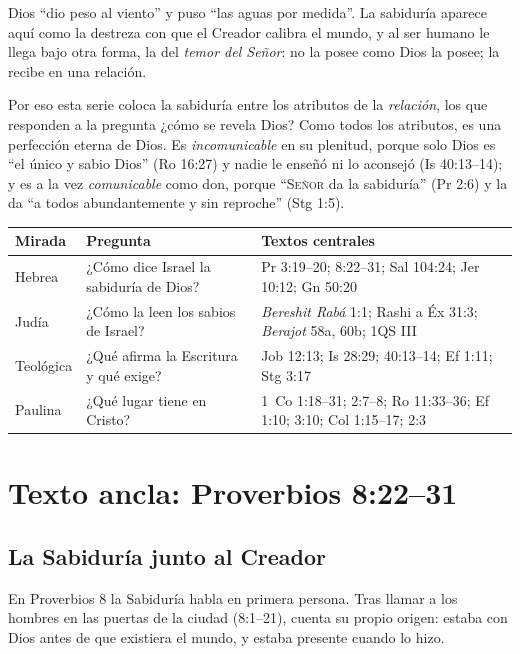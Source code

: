 \documentclass[11pt,letterpaper]{article}
\newcommand{\SENOR}{\textsc{Señor}}
\begin{document}
Dios ``dio peso al viento'' y puso ``las aguas por medida''. La sabiduría aparece aquí como la destreza con que el Creador calibra el mundo, y al ser humano le llega bajo otra forma, la del \emph{temor del Señor}: no la posee como Dios la posee; la recibe en una relación.

Por eso esta serie coloca la sabiduría entre los atributos de la \emph{relación}, los que responden a la pregunta ¿cómo se revela Dios? Como todos los atributos, es una perfección eterna de Dios. Es \emph{incomunicable} en su plenitud, porque solo Dios es ``el único y sabio Dios'' (Ro 16:27) y nadie le enseñó ni lo aconsejó (Is 40:13--14); y es a la vez \emph{comunicable} como don, porque ``\SENOR{} da la sabiduría'' (Pr 2:6) y la da ``a todos abundantemente y sin reproche'' (Stg 1:5).

\begin{center}\small\renewcommand{\arraystretch}{1.25}
\begin{tabular}{@{}L{3.4cm}L{5.4cm}L{5.6cm}@{}}
\toprule
\textbf{Mirada} & \textbf{Pregunta} & \textbf{Textos centrales} \\ \midrule
Hebrea & ¿Cómo dice Israel la sabiduría de Dios? & Pr 3:19--20; 8:22--31; Sal 104:24; Jer 10:12; Gn 50:20 \\
Judía & ¿Cómo la leen los sabios de Israel? & \emph{Bereshit Rabá} 1:1; Rashi a Éx 31:3; \emph{Berajot} 58a, 60b; 1QS III \\
Teológica & ¿Qué afirma la Escritura y qué exige? & Job 12:13; Is 28:29; 40:13--14; Ef 1:11; Stg 3:17 \\
Paulina & ¿Qué lugar tiene en Cristo? & 1~Co 1:18--31; 2:7--8; Ro 11:33--36; Ef 1:10; 3:10; Col 1:15--17; 2:3 \\
\bottomrule
\end{tabular}\end{center}

\section{Texto ancla: Proverbios 8:22--31}

\subsection{La Sabiduría junto al Creador}

En Proverbios 8 la Sabiduría habla en primera persona. Tras llamar a los hombres en las puertas de la ciudad (8:1--21), cuenta su propio origen: estaba con Dios antes de que existiera el mundo, y estaba presente cuando lo hizo.
\end{document}
